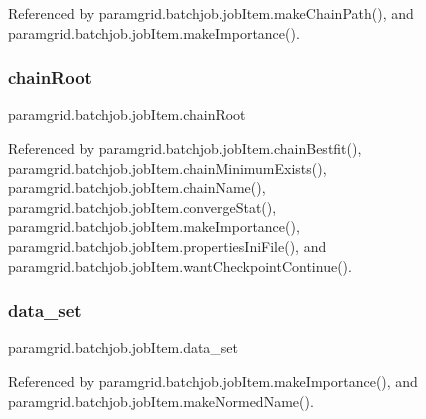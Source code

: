 Referenced by paramgrid.\+batchjob.\+job\+Item.\+make\+Chain\+Path(), and paramgrid.\+batchjob.\+job\+Item.\+make\+Importance().

\mbox{\label{classparamgrid_1_1batchjob_1_1jobItem_ada67490ca63eb730804f3e895e66babc}} 
\subsubsection{\texorpdfstring{chain\+Root}{chainRoot}}
{\footnotesize\ttfamily paramgrid.\+batchjob.\+job\+Item.\+chain\+Root}



Referenced by paramgrid.\+batchjob.\+job\+Item.\+chain\+Bestfit(), paramgrid.\+batchjob.\+job\+Item.\+chain\+Minimum\+Exists(), paramgrid.\+batchjob.\+job\+Item.\+chain\+Name(), paramgrid.\+batchjob.\+job\+Item.\+converge\+Stat(), paramgrid.\+batchjob.\+job\+Item.\+make\+Importance(), paramgrid.\+batchjob.\+job\+Item.\+properties\+Ini\+File(), and paramgrid.\+batchjob.\+job\+Item.\+want\+Checkpoint\+Continue().

\mbox{\label{classparamgrid_1_1batchjob_1_1jobItem_aa2bda614aa70f79336a2704f0b806cef}} 
\subsubsection{\texorpdfstring{data\+\_\+set}{data\_set}}
{\footnotesize\ttfamily paramgrid.\+batchjob.\+job\+Item.\+data\+\_\+set}



Referenced by paramgrid.\+batchjob.\+job\+Item.\+make\+Importance(), and paramgrid.\+batchjob.\+job\+Item.\+make\+Normed\+Name().

\mbox{\label{classparamgrid_1_1batchjob_1_1jobItem_a9a929b39633d20169047f6244326ef61}} 
